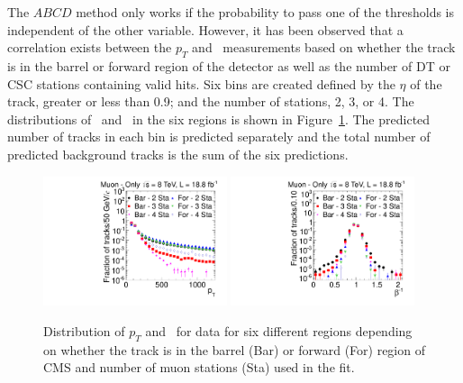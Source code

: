 The $ABCD$ method only works if the probability to pass one of the thresholds is independent of the other variable.
However, it has been observed that a correlation exists between the $p_T$ and \invbeta\ measurements based on whether the track is in the barrel or forward
region of the detector as well as the number of DT or CSC stations containing valid hits. 
Six bins are created defined by the $\eta$ of the track, greater or less than 0.9; and the number of stations, 2, 3, or 4.
The distributions of \pt\ and \invbeta\ in the six regions is shown in Figure~\ref{fig:SelVarBinned}.
The predicted number of tracks in each bin is predicted separately and the total number of predicted background tracks is the sum of the six predictions.

\begin{figure}
\centering
  \includegraphics[clip=false, trim=0.0cm 0cm 0.0cm 0cm, width=0.48\textwidth]{figures/muonly/Selection_Data8TeV_Pt_Binned_BS}
  \includegraphics[clip=false, trim=0.0cm 0cm 0.0cm 0cm, width=0.48\textwidth]{figures/muonly/Selection_Data8TeV_TOF_Binned_BS}
\caption[Distribution of $p_T$ and \invbeta\ for data in different prediction regions in the \muononly\ analysis]
{Distribution of $p_T$ and \invbeta\ for data for six different regions depending on whether the track is in the barrel (Bar)
or forward (For) region of CMS and number of muon stations (Sta) used in the fit.}
    \label{fig:SelVarBinned}
\end{figure}

